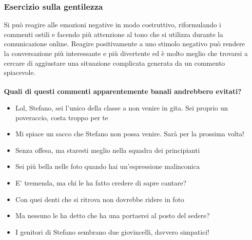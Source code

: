 \documentclass{article}
\begin{document}
\subsubsection{Esercizio sulla gentilezza}
\label{sec:Caso19}
Si può reagire alle emozioni negative in modo costruttivo, riformulando i commenti ostili e facendo più attenzione al tono che si utilizza durante la comunicazione online. Reagire positivamente a uno stimolo negativo può rendere la conversazione più interessante e più divertente ed è molto meglio che trovarsi a cercare di aggiustare una situazione complicata generata da un commento spiacevole. 
\\\vspace{5mm}\\
\textbf{Quali di questi commenti apparentemente banali andrebbero evitati?}
\begin{itemize}
	\item Lol, Stefano, sei l'unico della classe a non venire in gita. Sei proprio un poveraccio, costa troppo per te
	\item Mi spiace un sacco che Stefano non possa venire. Sarà per la prossima volta!
	\item Senza offesa, ma staresti meglio nella squadra dei principianti
	\item Sei più bella nelle foto quando hai un'espressione malinconica
	\item E' tremenda, ma chi le ha fatto credere di sapre cantare?
	\item Con quei denti che si ritrova non dovrebbe ridere in foto
	\item Ma nessuno le ha detto che ha una portaerei al posto del sedere?
	\item I genitori di Stefano sembrano due giovincelli, davvero simpatici!
\end{itemize}

\pagebreak
\end{document}
